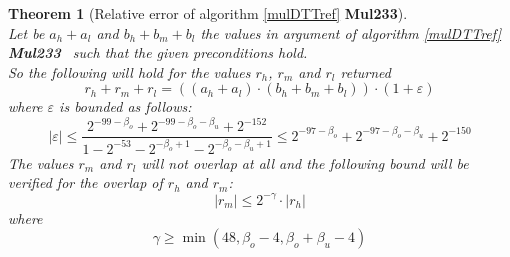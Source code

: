\documentclass[a4paper,10pt,twoside]{article}
\newtheorem{theorem}{Theorem}[section]
\newcommand{\hi}{\ensuremath{\mathit{h}}}
\newcommand{\mi}{\ensuremath{\mathit{m}}}
\newcommand{\lo}{\ensuremath{\mathit{l}}}
\newcommand{\MulDTT}{{\bf Mul233}}
\renewcommand{\epsilon}{\varepsilon}
\begin{document}
\begin{theorem}[Relative error of algorithm \ref{mulDTTref} \MulDTT] ~ \\
Let be $a_\hi + a_\lo$ and $b_\hi + b_\mi + b_\lo$ the values in argument of algorithm \ref{mulDTTref} \MulDTT~ such that 
the given preconditions hold.\\
So the following will hold for the values $r_\hi$, $r_\mi$ and $r_\lo$ returned
$$r_\hi + r_\mi + r_\lo = \left(\left(a_\hi + a_\lo \right) \cdot \left( b_\hi + b_\mi + b_\lo \right)\right) \cdot \left(1 + \epsilon\right)$$
where $\epsilon$ is bounded as follows:
$$\left \vert \epsilon \right \vert \leq \frac{2^{-99 - \beta_o} + 2^{-99 - \beta_o - \beta_u} + 2^{-152}}
                                              {1 - 2^{-53} - 2^{-\beta_o + 1} - 2^{-\beta_o - \beta_u + 1}}
                                    \leq 2^{-97 - \beta_o} + 2^{-97 - \beta_o - \beta_u} + 2^{-150}$$
The values $r_\mi$ and  $r_\lo$ will not overlap at all and the following bound will be verified for the overlap of 
$r_\hi$ and $r_\mi$:
$$\left \vert r_\mi \right \vert \leq 2^{-\gamma} \cdot \left \vert r_\hi \right \vert$$
where
$$\gamma \geq \min\left( 48, \beta_o - 4, \beta_o + \beta_u - 4 \right)$$
\end{theorem}
\end{document}
